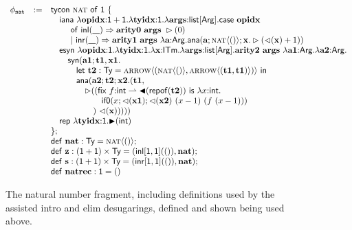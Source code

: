 \begin{figure}
\small
$
\begin{array}{lcl}
\phi_{\texttt{nat}} & := & {\sf tycon}~\textsc{nat}~{\sf of}~\textsf{1}~\{\\
&& \quad {\sf iana}~\lambda {\textbf{opidx}}{:}{\textsf{1}+\textsf{1}}.\lambda {\textbf{tyidx}}{:}{\textsf{1}}.\lambda {\textbf{args}}{:}{\textsf{list}[{\sf Arg}]}.
	{\sf case}~{\textbf{opidx}}\\
&&\quad\quad~{\sf of~inl}({\textbf{\_}}) \Rightarrow {\textbf{arity0}}~{\textbf{args}}~\rhd(0)\\
&&\quad\quad~{\sf |~inr}({\textbf{\_}})\Rightarrow{\textbf{arity1}}~{\textbf{args}}~\lambda {\textbf{a}}{:}{{\sf Arg}}.{\sf ana}({\textbf{a}}; \textsc{nat}\langle()\rangle; {\textbf{x}}.\rhd({\lhd}({\textbf{x}})+1))
\\
&&\quad {\sf esyn}~\lambda {\textbf{opidx}}{:}{\textsf{1}}.\lambda {\textbf{tyidx}}{:}{\textsf{1}}.\lambda {\textbf{x}}{:}{\textsf{ITm}}.\lambda {\textbf{args}}{:}{\textsf{list}[{\sf Arg}]}.{\textbf{arity2}}~{\textbf{args}}~\lambda {\textbf{a1}}{:}{{\sf Arg}}.\lambda {\textbf{a2}}{:}{{\sf Arg}}.\\
&&\quad\quad {\sf syn}({\textbf{a1}}; {\textbf{t1}}, {\textbf{x1}}.\\
&&\quad\quad\quad {\sf let}~{\textbf{t2}} : \textsf{Ty} = \textsc{arrow}\langle(\textsc{nat}\langle()\rangle, \textsc{arrow}\langle({\textbf{t1}}, {\textbf{t1}})\rangle)\rangle~{\sf in}~ \\
&&\quad\quad\quad {\sf ana}({\textbf{a2}}; {\textbf{t2}}; {\textbf{x2}}.({\textbf{t1}},\\
&&\quad\quad\quad\quad \rhd(({\sf fix~}f{:}{\sf int}\rightharpoonup{\blacktriangleleft}({\sf repof}({\textbf{t2}}))~{\sf is}~\lambda x{:}{\sf int}.\\&&\quad\quad\quad\quad\quad\quad {\sf if0}(x; {\lhd}({\textbf{x1}}); {
		{\lhd}({\textbf{x2}})~(x-1)~(f~(x-1))})\\
		&&\quad\quad\quad\quad\quad)~{\lhd}({\textbf{x}})))))\\
&&\quad {\sf rep}~\lambda {\textbf{tyidx}}{:}{\textsf{1}}.{\blacktriangleright}({\sf int})\\
&&\}; \\
&& {\sf def}~{\textbf{nat}}:\textsf{Ty} = \textsc{nat}\langle()\rangle;\\
&& {\sf def}~{\textbf{z}}:{(\textsf{1} + \textsf{1}) \times \textsf{Ty}}={({\sf inl}[\textsf{1},\textsf{1}](()), {\textbf{nat}})};\\
&& {\sf def}~{\textbf{s}}:{(\textsf{1} + \textsf{1}) \times \textsf{Ty}}={({\sf inr}[\textsf{1},\textsf{1}](()), {\textbf{nat}})};\\
&& {\sf def}~{\textbf{natrec}}:\textsf{1}=()
\end{array}
$
\caption{\small The natural number fragment, including definitions used by the assisted intro and elim desugarings, defined and shown being used above.}
\label{nat-atfrag}
\end{figure}
